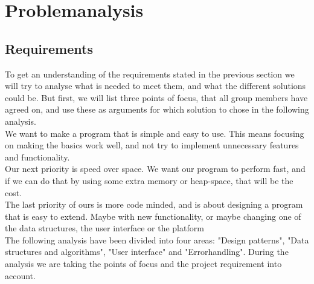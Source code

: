\documentclass[a4paper,10pt,titlepage]{article}
\begin{document}
	\section{Problemanalysis}
		\subsection{Requirements}
To get an understanding of the requirements stated in the previous section we will try to analyse what is needed to meet them, and what the different solutions could be. But first, we will list three points of focus, that all group members have agreed on, and use these as arguments for which solution to chose in the following analysis.\\
We want to make a program that is simple and easy to use. This means focusing on making the basics work well, and not try to implement unnecessary features and functionality.\\

Our next priority is speed over space. We want our program to perform fast, and if we can do that by using some extra     memory or heap-space, that will be the cost.\\

The last priority of ours is more code minded, and is about designing a program that is easy to extend. Maybe with new functionality, or maybe changing one of the data structures, the user interface or the platform\\

The following analysis have been divided into four areas: "Design patterns", "Data structures and algorithms", "User interface" and "Errorhandling". During the analysis we are taking the points of focus and the project requirement into account.
\end{document}
